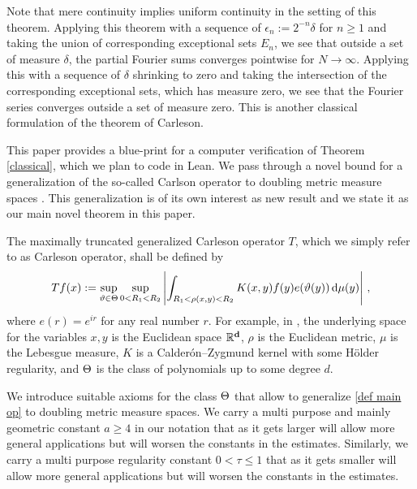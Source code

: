 Note that mere continuity implies uniform continuity
in the setting of this theorem. Applying this theorem
with a sequence of $\epsilon_n:= 2^{-n}\delta$ for $n\ge 1$
and taking the union of corresponding exceptional sets $E_n$, we see that
outside a set of measure $\delta$, the partial Fourier sums
converges pointwise for $N\to \infty$. Applying this with a sequence
of $\delta$ shrinking to zero and taking the intersection of the corresponding exceptional
sets, which has measure zero, we see that the Fourier series converges outside
a set of measure zero. This is another classical formulation  of the theorem of Carleson.

This paper provides a blue-print for a computer verification of Theorem \ref{classical}, which we plan to code in Lean.
We pass through a novel bound for a
generalization of the so-called Carlson operator
to doubling metric measure spaces . This generalization is of its own interest as new result and we state it as our main novel theorem in this paper.

The maximally truncated generalized Carleson operator $T$, which we  simply refer to as Carleson operator, shall be defined by
    \begin{equation}
        \label{def main op}
        Tf(x):=\sup_{\vartheta\in\Theta} \sup_{0 < R_1 < R_2}\left| \int_{R_1 <  \rho(x,y) < R_2}  K(x,y) f(y) e(\vartheta(y)) \, \mathrm{d}\mu(y) \right|\, ,
\end{equation}
where $e(r)=e^{ir}$ for any real number $r$.
For example, in
\cite{zk-polynomial}, the underlying space for the variables $x,y$ is the Euclidean space $\mathbb{R}^{\bf d}$, $\rho$ is the Euclidean metric, $\mu$ is the Lebesgue measure,
$K$ is a Calder\'on--Zygmund kernel with some H\"older regularity,
and $\Theta$ is the
class of  polynomials up to some degree $d$.


We introduce suitable axioms for the class $\Theta$
that allow to generalize \eqref{def main op} to doubling metric measure spaces.
We carry a multi purpose and mainly geometric constant $a\ge 4$ in our notation that as it gets larger will allow more general applications but will worsen the constants in the estimates.
Similarly, we carry a multi purpose regularity constant $0<\tau\le 1$ that as it gets smaller will allow more general applications but will worsen the constants in the estimates.

